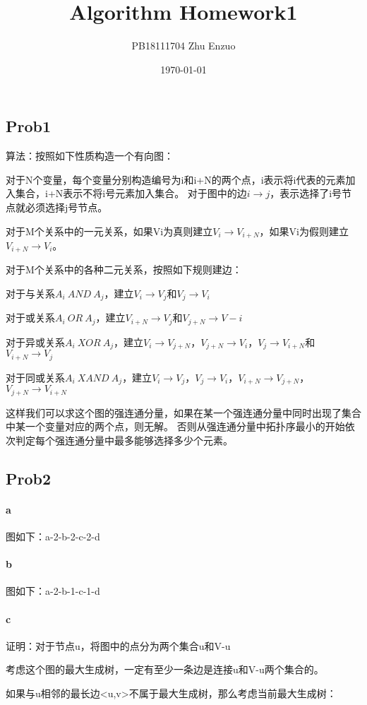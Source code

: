\documentclass{ctexart}
\title{Algorithm Homework1}
\author{PB18111704 Zhu Enzuo}
\date{\today}
\begin{document}
\maketitle
\subsection{Prob1}
算法：按照如下性质构造一个有向图：

对于N个变量，每个变量分别构造编号为i和i+N的两个点，i表示将i代表的元素加入集合，i+N表示不将i号元素加入集合。
对于图中的边$i \to j$，表示选择了i号节点就必须选择j号节点。

对于M个关系中的一元关系，如果Vi为真则建立$V_i \to V_{i+N}$，如果Vi为假则建立$V_{i+N} \to V_i$。

对于M个关系中的各种二元关系，按照如下规则建边：

对于与关系$A_i\ AND\ A_j$，建立$V_i \to V_j$和$V_j \to V_i$

对于或关系$A_i\ OR\ A_j$，建立$V_{i+N} \to V_j$和$V_{j+N} \to V-i$

对于异或关系$A_i\ XOR\ A_j$，建立$V_i \to V_{j+N}$，$V_{j+N} \to V_i$，$V_j \to V_{i+N}$和$V_{i+N} \to V_j$

对于同或关系$A_i\ XAND\ A_j$，建立$V_i \to V_j$，$V_j \to V_i$，$V_{i+N} \to V_{j+N}$，$V_{j+N} \to V_{i+N}$

这样我们可以求这个图的强连通分量，如果在某一个强连通分量中同时出现了集合中某一个变量对应的两个点，则无解。
否则从强连通分量中拓扑序最小的开始依次判定每个强连通分量中最多能够选择多少个元素。

\subsection{Prob2}
\paragraph{a} 图如下：a-2-b-2-c-2-d
\paragraph{b} 图如下：a-2-b-1-c-1-d
\paragraph{c}
证明：对于节点u，将图中的点分为两个集合{u}和{V-u}

考虑这个图的最大生成树，一定有至少一条边是连接{u}和{V-u}两个集合的。

如果与u相邻的最长边<u,v>不属于最大生成树，那么考虑当前最大生成树：
\end{document}
